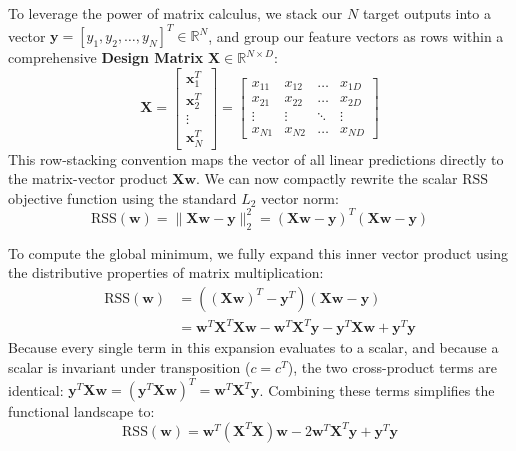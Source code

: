 \documentclass{article}
\begin{document}
To leverage the power of matrix calculus, we stack our $N$ target outputs into a vector $\mathbf{y} = [y_1, y_2, \dots, y_N]^T \in \mathbb{R}^N$, and group our feature vectors as rows within a comprehensive \textbf{Design Matrix} $\mathbf{X} \in \mathbb{R}^{N \times D}$:
\begin{equation}
\mathbf{X} = \begin{bmatrix} \mathbf{x}_1^T \\ \mathbf{x}_2^T \\ \vdots \\ \mathbf{x}_N^T \end{bmatrix} = \begin{bmatrix} x_{11} & x_{12} & \dots & x_{1D} \\ x_{21} & x_{22} & \dots & x_{2D} \\ \vdots & \vdots & \ddots & \vdots \\ x_{N1} & x_{N2} & \dots & x_{ND} \end{bmatrix}
\end{equation}
This row-stacking convention maps the vector of all linear predictions directly to the matrix-vector product $\mathbf{X}\mathbf{w}$. We can now compactly rewrite the scalar $\text{RSS}$ objective function using the standard $L_2$ vector norm:
\begin{equation}
\text{RSS}(\mathbf{w}) = \|\mathbf{X}\mathbf{w} - \mathbf{y}\|_2^2 = (\mathbf{X}\mathbf{w} - \mathbf{y})^T (\mathbf{X}\mathbf{w} - \mathbf{y})
\end{equation}

To compute the global minimum, we fully expand this inner vector product using the distributive properties of matrix multiplication:
\begin{align*}
\text{RSS}(\mathbf{w}) &= \left( (\mathbf{X}\mathbf{w})^T - \mathbf{y}^T \right) (\mathbf{X}\mathbf{w} - \mathbf{y}) \\
&= \mathbf{w}^T \mathbf{X}^T \mathbf{X} \mathbf{w} - \mathbf{w}^T \mathbf{X}^T \mathbf{y} - \mathbf{y}^T \mathbf{X} \mathbf{w} + \mathbf{y}^T \mathbf{y}
\end{align*}
Because every single term in this expansion evaluates to a scalar, and because a scalar is invariant under transposition ($c = c^T$), the two cross-product terms are identical: $\mathbf{y}^T \mathbf{X} \mathbf{w} = (\mathbf{y}^T \mathbf{X} \mathbf{w})^T = \mathbf{w}^T \mathbf{X}^T \mathbf{y}$. Combining these terms simplifies the functional landscape to:
\begin{equation}
\text{RSS}(\mathbf{w}) = \mathbf{w}^T \left(\mathbf{X}^T \mathbf{X}\right) \mathbf{w} - 2\mathbf{w}^T \mathbf{X}^T \mathbf{y} + \mathbf{y}^T \mathbf{y}
\end{equation}
\end{document}
